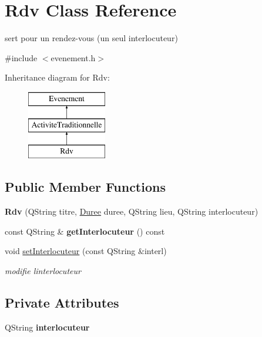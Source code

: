 \hypertarget{class_rdv}{}\section{Rdv Class Reference}
\label{class_rdv}


sert pour un rendez-\/vous (un seul interlocuteur)  




{\ttfamily \#include $<$evenement.\+h$>$}

Inheritance diagram for Rdv\+:\begin{figure}[H]
\begin{center}
\leavevmode
\includegraphics[height=3.000000cm]{class_rdv}
\end{center}
\end{figure}
\subsection*{Public Member Functions}
\begin{DoxyCompactItemize}
\item 
\hypertarget{class_rdv_a585f37d877d156d4491d39cbfe438e8a}{}{\bfseries Rdv} (Q\+String titre, \hyperlink{class_duree}{Duree} duree, Q\+String lieu, Q\+String interlocuteur)\label{class_rdv_a585f37d877d156d4491d39cbfe438e8a}

\item 
\hypertarget{class_rdv_a97231c0f56bdd957d32bd31918d9fce5}{}const Q\+String \& {\bfseries get\+Interlocuteur} () const \label{class_rdv_a97231c0f56bdd957d32bd31918d9fce5}

\item 
void \hyperlink{class_rdv_ac98a6180fddd005e1b364dbb0da2170a}{set\+Interlocuteur} (const Q\+String \&interl)
\begin{DoxyCompactList}\small\item\em modifie l\textquotesingle{}interlocuteur \end{DoxyCompactList}\end{DoxyCompactItemize}
\subsection*{Private Attributes}
\begin{DoxyCompactItemize}
\item 
\hypertarget{class_rdv_a102377cc114da4bc1ad38771d9ed18d5}{}Q\+String {\bfseries interlocuteur}\label{class_rdv_a102377cc114da4bc1ad38771d9ed18d5}

\end{DoxyCompactItemize}
